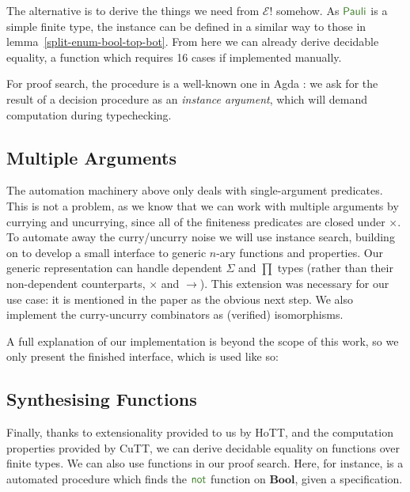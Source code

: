 The alternative is to derive the things we need from \(\mathcal{E}!\) somehow.
As \(\AgdaDatatype{Pauli}\) is a simple finite type, the instance can be defined
in a similar way to those in lemma~\ref{split-enum-bool-top-bot}.
From here we can already derive decidable equality, a function which requires 16
cases if implemented manually.

For proof search, the procedure is a well-known one in Agda
\cite{devrieseBrightSideType2011}: we ask for the result of a decision procedure
as an \emph{instance argument}, which will demand computation during
typechecking.
\subsection{Multiple Arguments}
The automation machinery above only deals with single-argument predicates.
This is not a problem, as we know that we can work with multiple arguments by
currying and uncurrying, since all of the finiteness predicates are closed under
\(\times\).
To automate away the curry/uncurry noise we will use instance search, building
on \cite{allaisGenericLevelPolymorphic2019} to develop a small interface to
generic \(n\)-ary functions and properties.
Our generic representation can handle dependent \(\Sigma\) and \(\prod\)
types (rather than their non-dependent counterparts, \(\times\) and
\(\rightarrow\)).
This extension was necessary for our use case: it is mentioned in the paper
as the obvious next step. 
We also implement the curry-uncurry combinators as (verified) isomorphisms.

A full explanation of our implementation is beyond the scope of this work, so we
only present the finished interface, which is used like so:
\subsection{Synthesising Functions}
Finally, thanks to extensionality provided to us by HoTT, and the computation
properties provided by CuTT, we can derive decidable equality on functions over
finite types.
We can also use functions in our proof search.
Here, for instance, is a automated procedure which finds the
\(\AgdaFunction{not}\) function on \(\mathbf{Bool}\), given a specification.




 